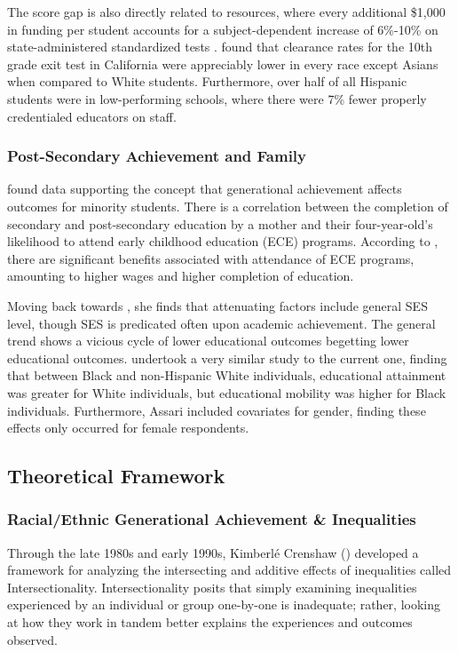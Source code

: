 \documentclass[jou,12pt,floatsintext]{apa7}
\begin{document}
The score gap is also directly related to resources, where every additional \$1,000 in funding per student accounts for a subject-dependent increase of 6\%-10\% on state-administered standardized tests \parencite{condron_disparities_2003, reed_educational_nodate}. \textcite{reed_educational_nodate} found that clearance rates for the 10th grade exit test in California were appreciably lower in every race except Asians when compared to White students. Furthermore, over half of all Hispanic students were in low-performing schools, where there were 7\% fewer properly credentialed educators on staff.

\subsubsection{Post-Secondary Achievement and Family}
\textcite{reed_educational_nodate} found data supporting the concept that generational achievement affects outcomes for minority students. There is a correlation between the completion of secondary and post-secondary education by a mother and their four-year-old's likelihood to attend early childhood education (ECE) programs. According to \textcite{jones_benefits_2024},  there are significant benefits associated with attendance of ECE programs, amounting to higher wages and higher completion of education.

Moving back towards \textcite{reed_educational_nodate}, she finds that attenuating factors include general SES level, though SES is predicated often upon academic achievement. The general trend shows a vicious cycle of lower educational outcomes begetting lower educational outcomes. \textcite{assari_parental_2018} undertook a very similar study to the current one, finding that between Black and non-Hispanic White individuals, educational attainment was greater for White individuals, but educational mobility was higher for Black individuals. Furthermore, Assari included covariates for gender, finding these effects only occurred for female respondents.

\subsection{Theoretical Framework}
\subsubsection{Racial/Ethnic Generational Achievement \& Inequalities}

Through the late 1980s and early 1990s, Kimberlé Crenshaw () developed a framework for analyzing the intersecting and additive effects of inequalities called Intersectionality. Intersectionality posits that simply examining inequalities experienced by an individual or group one-by-one is inadequate; rather, looking at how they work in tandem better explains the experiences and outcomes observed.
\end{document}
